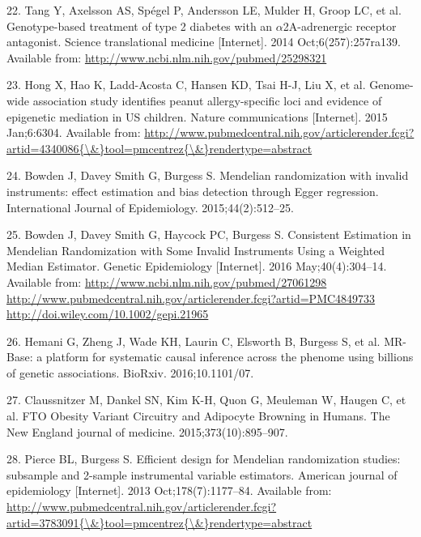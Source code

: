 \documentclass[]{article}
\begin{document}
\hypertarget{ref-Tang2014}{}
22. Tang Y, Axelsson AS, Spégel P, Andersson LE, Mulder H, Groop LC, et
al. Genotype-based treatment of type 2 diabetes with an
\(\alpha\)2A-adrenergic receptor antagonist. Science translational
medicine {[}Internet{]}. 2014 Oct;6(257):257ra139. Available from:
\url{http://www.ncbi.nlm.nih.gov/pubmed/25298321}

\hypertarget{ref-Hong2015}{}
23. Hong X, Hao K, Ladd-Acosta C, Hansen KD, Tsai H-J, Liu X, et al.
Genome-wide association study identifies peanut allergy-specific loci
and evidence of epigenetic mediation in US children. Nature
communications {[}Internet{]}. 2015 Jan;6:6304. Available from:
\href{http://www.pubmedcentral.nih.gov/articlerender.fcgi?artid=4340086\%7B/\&\%7Dtool=pmcentrez\%7B/\&\%7Drendertype=abstract}{http://www.pubmedcentral.nih.gov/articlerender.fcgi?artid=4340086\{\textbackslash{}\&\}tool=pmcentrez\{\textbackslash{}\&\}rendertype=abstract}

\hypertarget{ref-Bowden2015}{}
24. Bowden J, Davey Smith G, Burgess S. Mendelian randomization with
invalid instruments: effect estimation and bias detection through Egger
regression. International Journal of Epidemiology. 2015;44(2):512--25.

\hypertarget{ref-Bowden2016b}{}
25. Bowden J, Davey Smith G, Haycock PC, Burgess S. Consistent
Estimation in Mendelian Randomization with Some Invalid Instruments
Using a Weighted Median Estimator. Genetic Epidemiology {[}Internet{]}.
2016 May;40(4):304--14. Available from:
\href{http://www.ncbi.nlm.nih.gov/pubmed/27061298\%20http://www.pubmedcentral.nih.gov/articlerender.fcgi?artid=PMC4849733\%20http://doi.wiley.com/10.1002/gepi.21965}{http://www.ncbi.nlm.nih.gov/pubmed/27061298 http://www.pubmedcentral.nih.gov/articlerender.fcgi?artid=PMC4849733 http://doi.wiley.com/10.1002/gepi.21965}

\hypertarget{ref-Hemani2016}{}
26. Hemani G, Zheng J, Wade KH, Laurin C, Elsworth B, Burgess S, et al.
MR-Base: a platform for systematic causal inference across the phenome
using billions of genetic associations. BioRxiv. 2016;10.1101/07.

\hypertarget{ref-Claussnitzer2015}{}
27. Claussnitzer M, Dankel SN, Kim K-H, Quon G, Meuleman W, Haugen C, et
al. FTO Obesity Variant Circuitry and Adipocyte Browning in Humans. The
New England journal of medicine. 2015;373(10):895--907.

\hypertarget{ref-Pierce2013}{}
28. Pierce BL, Burgess S. Efficient design for Mendelian randomization
studies: subsample and 2-sample instrumental variable estimators.
American journal of epidemiology {[}Internet{]}. 2013
Oct;178(7):1177--84. Available from:
\href{http://www.pubmedcentral.nih.gov/articlerender.fcgi?artid=3783091\%7B/\&\%7Dtool=pmcentrez\%7B/\&\%7Drendertype=abstract}{http://www.pubmedcentral.nih.gov/articlerender.fcgi?artid=3783091\{\textbackslash{}\&\}tool=pmcentrez\{\textbackslash{}\&\}rendertype=abstract}
\end{document}
